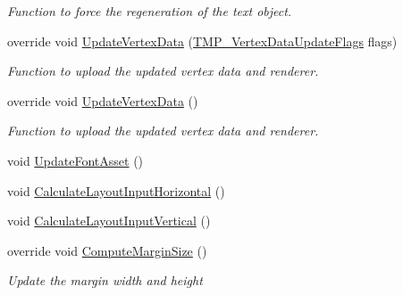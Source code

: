 \begin{DoxyCompactItemize}
\begin{DoxyCompactList}\small\item\em Function to force the regeneration of the text object. \end{DoxyCompactList}\item 
override void \mbox{\hyperlink{class_t_m_pro_1_1_text_mesh_pro_a0011d887bd47e96fc4d12ee9d6c486f3}{Update\+Vertex\+Data}} (\mbox{\hyperlink{namespace_t_m_pro_a517464fab2ef7ff5b9658d2acaf49a57}{T\+M\+P\+\_\+\+Vertex\+Data\+Update\+Flags}} flags)
\begin{DoxyCompactList}\small\item\em Function to upload the updated vertex data and renderer. \end{DoxyCompactList}\item 
override void \mbox{\hyperlink{class_t_m_pro_1_1_text_mesh_pro_a73f2ed2115c65a8a5efcab863eb53383}{Update\+Vertex\+Data}} ()
\begin{DoxyCompactList}\small\item\em Function to upload the updated vertex data and renderer. \end{DoxyCompactList}\item 
void \mbox{\hyperlink{class_t_m_pro_1_1_text_mesh_pro_abd4d7b6017050265bade2ed033d6d781}{Update\+Font\+Asset}} ()
\item 
void \mbox{\hyperlink{class_t_m_pro_1_1_text_mesh_pro_a80daf54d9c201cbb21a4c409224e579b}{Calculate\+Layout\+Input\+Horizontal}} ()
\item 
void \mbox{\hyperlink{class_t_m_pro_1_1_text_mesh_pro_a9e9a22b4db22929f0a06c5af3bec6e5a}{Calculate\+Layout\+Input\+Vertical}} ()
\item 
override void \mbox{\hyperlink{class_t_m_pro_1_1_text_mesh_pro_af98c43be93b6f588b2086aff6957197e}{Compute\+Margin\+Size}} ()
\begin{DoxyCompactList}\small\item\em Update the margin width and height \end{DoxyCompactList}\end{DoxyCompactItemize}
